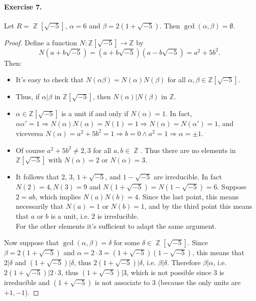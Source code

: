 \documentclass[12pt,a4paper]{report}
\theoremstyle{definition}
\theoremstyle{num.custom-title}
\DeclareMathOperator{\Z}{\mathbb{Z}}
\DeclareMathOperator{\imp}{\Rightarrow}
\begin{document}
\paragraph{Exercise 7.} Let $R=\Z[\sqrt{-5}]$, $\alpha=6$ and $\beta=2(1+\sqrt{-5})$. Then $\gcd(\alpha,\beta)=\emptyset$.
\begin{proof}

Define a function $N: \mathbb{Z}[\sqrt{-5}] \to \mathbb{Z}$ by 
\[
N(a+b\sqrt{-5}) = (a+b\sqrt{-5})(a-b\sqrt{-5}) = a^2+5b^2.
\]
Then:
\begin{itemize}
\item It's easy to check that $N(\alpha\beta) = N(\alpha)N(\beta)$ for all $\alpha,\beta\in\mathbb{Z}[\sqrt{-5}]$.
\item Thus, if $\alpha|\beta$ in $\mathbb{Z}[\sqrt{-5}]$, then $N(\alpha)|N(\beta)$ in $\mathbb{Z}$.
\item $\alpha\in\mathbb{Z}[\sqrt{-5}]$ is a unit if and only if $N(\alpha)=1$. In fact, $\alpha \alpha'=1 \imp N(\alpha)N(\alpha)=N(1)=1 \imp N(\alpha)=N(\alpha')=1$, and viceversa $N(\alpha)=a^2+5b^2=1 \imp b=0 \wedge a^2=1 \imp \alpha= \pm 1$.
\item Of course $a^2+5b^2 \ne 2,3$ for all $a,b \in \Z$. Thus there are no elements in $\mathbb{Z}[\sqrt{-5}]$ with $N(\alpha)=2$ or $N(\alpha)=3$.
\item It follows that $2$, $3$, $1+\sqrt{-5}$, and $1-\sqrt{-5}$ are irreducible. In fact $N(2)=4, N(3)=9$ and $N(1+\sqrt{-5})=N(1-\sqrt{-5})=6$. Suppose $2=ab$, which implies $N(a)N(b)=4$. Since the last point, this means necessarily that $N(a)=1$ or $N(b)=1$, and by the third point this means that $a$ or $b$ is a unit, i.e. $2$ is irreducible.\\
For the other elements it's sufficient to adapt the same argument.
\end{itemize}

Now suppose that $\gcd(\alpha,\beta)=\delta$ for some $\delta \in \Z[\sqrt{-5}]$. Since $\beta=2(1+\sqrt{-5})$ and $\alpha=2 \cdot 3 = (1+\sqrt{-5})(1-\sqrt{-5})$, this means that $2|\delta$ and $(1+\sqrt{-5})|\delta$, thus $2(1+\sqrt{-5})|\delta$, i.e. $\beta | \delta$. Therefore $\beta | \alpha$, i.e. $2(1+\sqrt{-5}) | 2 \cdot 3$, thus $(1+\sqrt{-5})|3$, which is not possible since $3$ is irreducible and $(1+\sqrt{-5})$ is not associate to $3$ (because the only units are $+1,-1$).


\end{proof}
\end{document}
